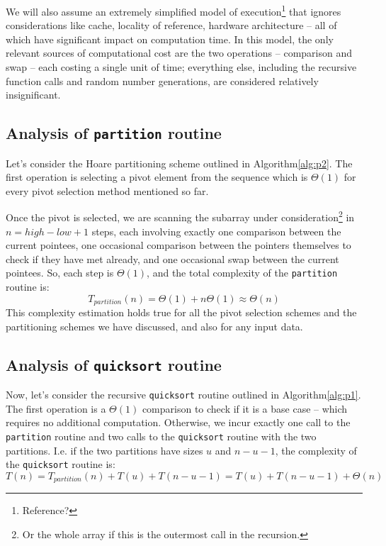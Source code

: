 \documentclass[]{finalproject}
\begin{document}
We will also assume an extremely simplified model of execution\footnote{Reference?} that ignores considerations like cache, locality of reference, hardware architecture -- all of which have significant impact on computation time. In this model, the only relevant sources of computational cost are the two operations -- comparison and swap -- each costing a single unit of time; everything else, including the recursive function calls and random number generations, are considered relatively insignificant.

\subsection{Analysis of \texttt{partition} routine}

Let's consider the Hoare partitioning scheme outlined in Algorithm\ref{alg:p2}. The first operation is selecting a pivot element from the sequence which is $\Theta(1)$ for every pivot selection method mentioned so far.

Once the pivot is selected, we  are scanning the subarray under consideration\footnote{Or the whole array if this is the outermost call in the recursion.} in $n = high - low + 1$ steps, each involving exactly one comparison between the current pointees, one occasional comparison between the pointers themselves to check if they have met already, and one occasional swap between the current pointees. So, each step is $\Theta(1)$, and the total complexity of the \texttt{partition} routine is: $$T_{partition}(n) = \Theta(1) + n\Theta(1) \approx \Theta(n)$$
This complexity estimation holds true for all the pivot selection schemes and the partitioning schemes we have discussed, and also for any input data.

\subsection{Analysis of \texttt{quicksort} routine}

Now, let's consider the recursive \texttt{quicksort} routine outlined in Algorithm\ref{alg:p1}. The first operation is a $\Theta(1)$ comparison to check if it is a base case -- which requires no additional computation. Otherwise, we incur exactly one call to the \texttt{partition} routine and two calls to the \texttt{quicksort} routine with the two partitions. I.e. if the two partitions have sizes $u$ and $n-u-1$, the complexity of the \texttt{quicksort} routine is: $$T(n) = T_{partition}(n) + T(u) + T(n-u-1) = T(u) + T(n-u-1) + \Theta(n)$$
\end{document}
